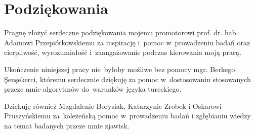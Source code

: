     \thispagestyle{empty}
    \setcounter{page}{3}

\chapter*{Podziękowania}

Pragnę złożyć serdeczne podziękowania mojemu promotorowi prof. dr. hab. Adamowi Przepiórkowskiemu za inspirację i~pomoc w~prowadzeniu badań oraz cierpliwość, wyrozumiałość i~zaangażowanie podczas kierowania moją pracą.

Ukończenie niniejszej pracy nie~byłoby możliwe bez pomocy mgr. Berkego \c{S}en\c{s}ekerci, któremu serdecznie dziękuję za pomoc w~dostosowaniu stosowanych przeze mnie algorytmów do~warunków języka tureckiego.

Dziękuję również Magdalenie Borysiak, Katarzynie Zrobek i Oskarowi Pruszyńskiemu za~koleżeńską pomoc w~prowadzeniu badań i zgłębianiu wiedzy na temat badanych przeze mnie zjawisk.
    
    \tableofcontents